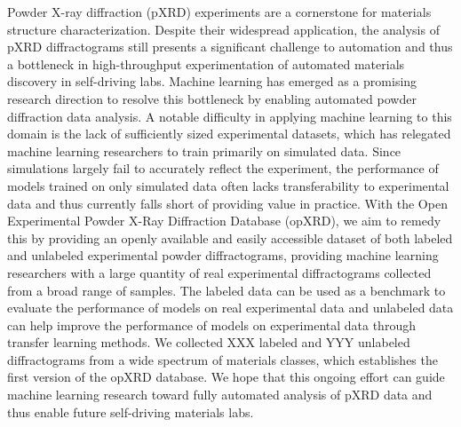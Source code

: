 Powder X-ray diffraction (pXRD) experiments are a cornerstone for materials structure characterization.
Despite their widespread application, the analysis of pXRD diffractograms still presents a significant challenge to automation and thus a bottleneck in high-throughput experimentation of automated materials discovery in self-driving labs.
Machine learning has emerged as a promising research direction to resolve this bottleneck by enabling automated powder diffraction data analysis.
A notable difficulty in applying machine learning to this domain is the lack of sufficiently sized experimental datasets, which has relegated machine learning researchers to train primarily on simulated data. Since simulations largely fail to accurately reflect the experiment, the performance of models trained on only simulated data often lacks transferability to experimental data and thus currently falls short of providing value in practice.
With the Open Experimental Powder X-Ray Diffraction Database (opXRD), we aim to remedy this by providing an openly available and easily accessible dataset of both labeled and unlabeled experimental powder diffractograms, providing machine learning researchers with a large quantity of real experimental diffractograms collected from a broad range of samples. The labeled data can be used as a benchmark to evaluate the performance of models on real experimental data and unlabeled data can help improve the performance of models on experimental data through transfer learning methods. 
We collected XXX labeled and YYY unlabeled diffractograms from a wide spectrum of materials classes, which establishes the first version of the opXRD database.
We hope that this ongoing effort can guide machine learning research toward fully automated analysis of pXRD data and thus enable future self-driving materials labs.
